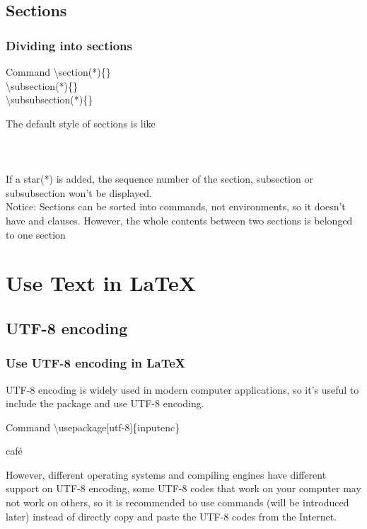 \documentclass{beamer}
\newenvironment{command}{\begin{block}{Command}}{\end{block}}
\newcommand{\samplecommand}[1]{\alert{\textbackslash #1}}
\begin{document}
\subsection{Sections}

\begin{frame}
	\frametitle{Dividing into sections}
	\begin{command}
		\samplecommand{section(*)}\{\}\\
		\samplecommand{subsection(*)}\{\}\\
		\samplecommand{subsubsection(*)}\{\}\\
	\end{command}
	The default style of sections is like\\
	\\
	\\
	\\[0.5em]
	If a star(\alert{*}) is added, the sequence number of the section, subsection or subsubsection won't be displayed.\\
	\alert{Notice:} Sections can be sorted into commands, not environments, so it doesn't have  and  clauses. However, the whole contents between two sections is belonged to one section
\end{frame}

\section{Use Text in \LaTeX}
\begin{frame}
\end{frame}

\subsection{UTF-8 encoding}

\begin{frame}
	\frametitle{Use UTF-8 encoding in \LaTeX}
	UTF-8 encoding is widely used in modern computer applications, so it's useful to include the  package and use UTF-8 encoding.
	\begin{command}
		\samplecommand{usepackage}[utf-8]\{inputenc\}
	\end{command}
	\begin{example}
		café
	\end{example}
	However, different operating systems and compiling engines have different support on UTF-8 encoding, some UTF-8 codes that work on your computer may not work on others, so it is recommended to use commands (will be introduced later) instead of directly copy and paste the UTF-8 codes from the Internet.
\end{frame}
\end{document}
